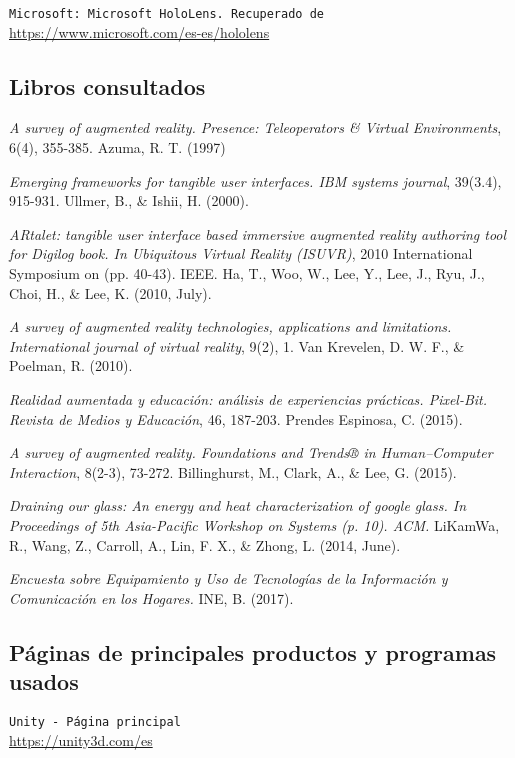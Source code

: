 {\tt Microsoft: Microsoft HoloLens. Recuperado de }\\
\url{https://www.microsoft.com/es-es/hololens}


\subsection*{Libros consultados}

{\em A survey of augmented reality. Presence: Teleoperators & Virtual Environments}, 6(4), 355-385. Azuma, R. T. (1997)

{\em Emerging frameworks for tangible user interfaces. IBM systems journal}, 39(3.4), 915-931. Ullmer, B., & Ishii, H. (2000).

{\em ARtalet: tangible user interface based immersive augmented reality authoring tool for Digilog book. In Ubiquitous Virtual Reality (ISUVR)}, 2010 International Symposium on (pp. 40-43). IEEE. Ha, T., Woo, W., Lee, Y., Lee, J., Ryu, J., Choi, H., & Lee, K. (2010, July).

{\em A survey of augmented reality technologies, applications and limitations. International journal of virtual reality},  9(2), 1. Van Krevelen, D. W. F., & Poelman, R. (2010).

{\em Realidad aumentada y educación: análisis de experiencias prácticas. Pixel-Bit. Revista de Medios y Educación}, 46, 187-203. Prendes Espinosa, C. (2015).

{\em A survey of augmented reality. Foundations and Trends® in Human–Computer Interaction}, 8(2-3), 73-272. Billinghurst, M., Clark, A., & Lee, G. (2015).

{\em Draining our glass: An energy and heat characterization of google glass. In Proceedings of 5th Asia-Pacific Workshop on Systems (p. 10). ACM.} LiKamWa, R., Wang, Z., Carroll, A., Lin, F. X., & Zhong, L. (2014, June).

{\em Encuesta sobre Equipamiento y Uso de Tecnologías de la Información y Comunicación en los Hogares.} INE, B. (2017).


\subsection*{Páginas de principales productos y programas usados}

 {\tt Unity - Página principal}\\
\url{https://unity3d.com/es}

